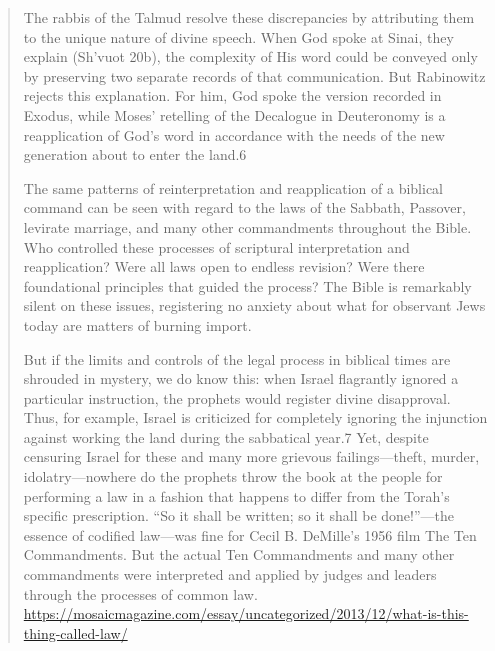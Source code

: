 \documentclass[11pt]{article}
\begin{document}
\begin{quote}
The rabbis of the Talmud resolve these discrepancies by attributing them to the unique nature of divine speech. When God spoke at Sinai, they explain (Sh’vuot 20b), the complexity of His word could be conveyed only by preserving two separate records of that communication. But Rabinowitz rejects this explanation. For him, God spoke the version recorded in Exodus, while Moses’ retelling of the Decalogue in Deuteronomy is a reapplication of God’s word in accordance with the needs of the new generation about to enter the land.6

The same patterns of reinterpretation and reapplication of a biblical command can be seen with regard to the laws of the Sabbath, Passover, levirate marriage, and many other commandments throughout the Bible. Who controlled these processes of scriptural interpretation and reapplication? Were all laws open to endless revision? Were there foundational principles that guided the process? The Bible is remarkably silent on these issues, registering no anxiety about what for observant Jews today are matters of burning import.

But if the limits and controls of the legal process in biblical times are shrouded in mystery, we do know this: when Israel flagrantly ignored a particular instruction, the prophets would register divine disapproval. Thus, for example, Israel is criticized for completely ignoring the injunction against working the land during the sabbatical year.7 Yet, despite censuring Israel for these and many more grievous failings—theft, murder, idolatry—nowhere do the prophets throw the book at the people for performing a law in a fashion that happens to differ from the Torah’s specific prescription. “So it shall be written; so it shall be done!”—the essence of codified law—was fine for Cecil B. DeMille’s 1956 film The Ten Commandments. But the actual Ten Commandments and many other commandments were interpreted and applied by judges and leaders through the processes of common law.
\url{https://mosaicmagazine.com/essay/uncategorized/2013/12/what-is-this-thing-called-law/}
\end{quote}
\end{document}
